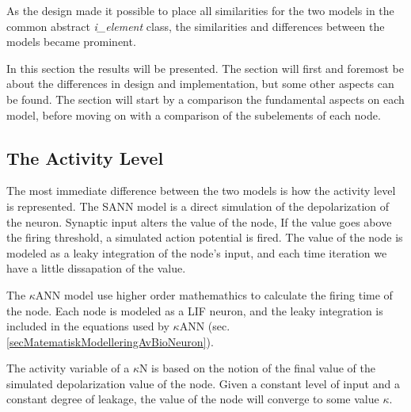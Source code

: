 	As the design made it possible to place all similarities for the two models in the common abstract \emph{i\_element} class, the similarities and differences between the models became prominent.
	
	In this section the results will be presented.  %
	The section will first and foremost be about the differences in design and implementation, but some other aspects can be found. %
	The section will start by a comparison the fundamental aspects on each model, before moving on with a comparison of the subelements of each node.

	\subsection{The Activity Level}
	
	The most immediate difference between the two models is how the activity level is represented.
	The SANN model is a direct simulation of the depolarization of the neuron. 
	Synaptic input alters the value of the node, 
	If the value goes above the firing threshold, a simulated action potential is fired.
	The value of the node is modeled as a leaky integration of the node's input, and each time iteration we have a little dissapation of the value.

	The $\kappa$ANN model use higher order mathemathics to calculate the firing time of the node. %
	Each node is modeled as a LIF neuron, and the leaky integration is included in the equations used by $\kappa$ANN (sec. \ref{secMatematiskModelleringAvBioNeuron}).
	
	The activity variable of a $\kappa$N is based on the notion of the final value of the simulated depolarization value of the node.
	Given a constant level of input and a constant degree of leakage, the value of the node will converge to some value $\kappa$.

